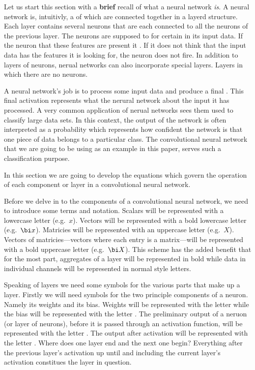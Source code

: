 \startsection[title=Convolutional neural networks and their components]
Let us start this section with a {\bf brief} recall of what a neural network {\em is}.
A neural network is, intuitivly, a  of  which are connected together in a layerd structure.
Each layer contains several neurons that are each connected to all the neurons of the previous layer. 
The neurons are supposed to  for certain  in its input data.
If the neuron  that these features are present it .
If it does not think that the input data has the features it is looking for, the neuron does not fire.
In addition to layers of neurons, nerual networks can also incorporate special  layers.
Layers in which there are no neurons.

A neural network's job is to process some input data and produce a final .
This final activation represents what the nerural network  about the input it has processed.
A very common application of nerual networks sees them used to classify large data sets.
In this context, the output of the network is often interpreted as a probability which represents how confident the network is that one piece of data belongs to a particular class.
The convolutional neural network that we are going to be using as an example in this paper, serves such a classification purpose.

In this section we are going to develop the equations which govern the operation of each component or layer in a convolutional neural network.

\startsubsubject[title=Terminology and notation]
Before we delve in to the components of a convolutional neural network, we need to introduce some terms and notation.
Scalars will be represented with a lowercase letter (e.g.\ $x$).
Vectors will be represented with a bold lowercase letter (e.g.\ $\bi x$).
Matricies will be represented with an uppercase letter (e.g.\ $X$).
Vectors of matricies---vectors where each entry is a matrix---will be represented with a bold uppercase letter (e.g.\ $\bi X$).
This scheme has the added benefit that for the most part, aggregates of a layer will be represented in bold while data in individual channels will be represented in normal style letters.

Speaking of layers we need some symbols for the various parts that make up a layer.
Firstly we will need symbols for the two principle components of a neuron.
Namely its weights and its bias.
Weights will be represented with the letter  while the bias will be represented with the letter .
The preliminary output of a neruon (or layer of neurons), before it is passed through an activation function, will be represented with the letter .
The output after activation will be represented with the letter .
Where does one layer end and the next one begin?
Everything after the previous layer's activation up until and including the current layer's activation constitues the layer in question.

